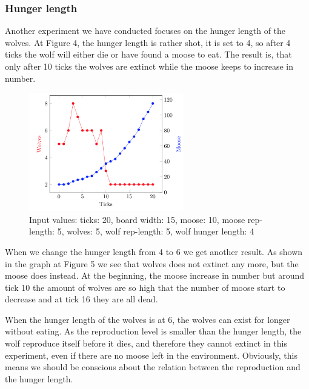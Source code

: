 \documentclass[a4paper]{report}
\begin{document}
\subsubsection*{Hunger length}

Another experiment we have conducted focuses on the hunger length of the wolves. At Figure 4, the hunger length is rather shot, it is set to 4, so after 4 ticks the wolf will either die or have found a moose to eat. The result is, that only after 10 ticks the wolves are extinct while the moose keeps to increase in number.

\begin{figure}[H]
\centering
\includegraphics[width=0.60\textwidth]{Experiments/sim_hunlen_a1}
\caption{Input values: ticks: 20, board width: 15, moose: 10, moose rep-length: 5, wolves: 5, wolf rep-length: 5, wolf hunger length: 4}
\end{figure}

When we change the hunger length from 4 to 6 we get another result. As shown in the graph at Figure 5 we see that wolves does not extinct any more, but the moose does instead. At the beginning, the moose increase in number but around tick 10 the amount of wolves are so high that the number of moose start to decrease and at tick 16 they are all dead.

When the hunger length of the wolves is at 6, the wolves can exist for longer without eating. As the reproduction level is smaller than the hunger length, the wolf reproduce itself before it dies, and therefore they cannot extinct in this experiment, even if there are no moose left in the environment. Obviously, this means we should be conscious about the relation between the reproduction and the hunger length.
\end{document}

